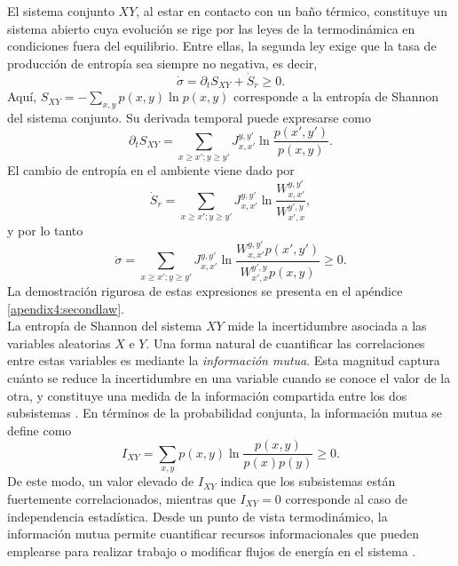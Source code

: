 El sistema conjunto \(XY\), al estar en contacto con un baño térmico, constituye un sistema abierto cuya evolución se rige por las leyes de la termodinámica en condiciones fuera del equilibrio. Entre ellas, la segunda ley exige que la tasa de producción de entropía sea siempre no negativa, es decir,
\begin{equation*}
    \dot{\sigma} = \partial_{t}S_{XY} + \dot{S}_{r} \geq 0. 
\end{equation*}
Aquí, \( S_{XY} = - \sum_{x,y} p(x,y) \ln p(x,y) \) corresponde a la entropía de Shannon del sistema conjunto. Su derivada temporal puede expresarse como
\begin{equation*}
    \partial_{t}S_{XY} = \sum_{x\geq x'; y\geq y'} J_{x,x'}^{y,y'} \ln \frac{p(x',y')}{p(x,y)}.
\end{equation*}
El cambio de entropía en el ambiente viene dado por
\begin{equation*}
    \dot{S}_{r} = \sum_{x\geq x'; y\geq y'} J_{x,x'}^{y,y'} \ln \frac{W_{x,x'}^{y,y'}}{W_{x',x}^{y',y}},
\end{equation*}
y por lo tanto
\begin{equation*}
    \dot{\sigma} = \sum_{x\geq x'; y\geq y'} J_{x,x'}^{y,y'} \ln \frac{ W_{x,x'}^{y,y'}p(x',y')  }{ W_{x',x}^{y',y}p(x,y) } \geq 0.
\end{equation*}
La demostración rigurosa de estas expresiones se presenta en el apéndice \ref{apendix4:secondlaw}.  
\\

La entropía de Shannon del sistema \( XY \) mide la incertidumbre asociada a las variables aleatorias \( X \) e \( Y \). Una forma natural de cuantificar las correlaciones entre estas variables es mediante la \textit{información mutua}. Esta magnitud captura cuánto se reduce la incertidumbre en una variable cuando se conoce el valor de la otra, y constituye una medida de la información compartida entre los dos subsistemas \cite{parrondo2015thermodynamics,cover1999elements}. En términos de la probabilidad conjunta, la información mutua se define como
\begin{equation*}
    I_{XY} = \sum_{x,y} p(x,y) \ln \frac{p(x,y)}{p(x)p(y)} \geq 0. 
\end{equation*}
De este modo, un valor elevado de \( I_{XY} \) indica que los subsistemas están fuertemente correlacionados, mientras que \( I_{XY}=0 \) corresponde al caso de independencia estadística. Desde un punto de vista termodinámico, la información mutua permite cuantificar recursos informacionales que pueden emplearse para realizar trabajo o modificar flujos de energía en el sistema \cite{parrondo2015thermodynamics}.  
\\

